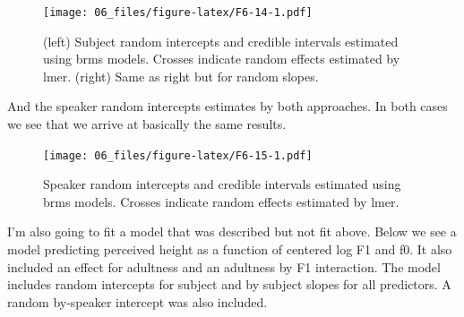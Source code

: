 \documentclass[
]{book}
\begin{document}
\begin{figure}
\centering
\texttt{[image: 06\_files/figure-latex/F6-14-1.pdf]}
\caption{\label{fig:F6-14}(left) Subject random intercepts and credible intervals estimated using brms models. Crosses indicate random effects estimated by lmer. (right) Same as right but for random slopes.}
\end{figure}

And the speaker random intercepts estimates by both approaches. In both cases we see that we arrive at basically the same results.

\begin{figure}
\centering
\texttt{[image: 06\_files/figure-latex/F6-15-1.pdf]}
\caption{\label{fig:F6-15}Speaker random intercepts and credible intervals estimated using brms models. Crosses indicate random effects estimated by lmer.}
\end{figure}

I'm also going to fit a model that was described but not fit above. Below we see a model predicting perceived height as a function of centered log F1 and f0. It also included an effect for adultness and an adultness by F1 interaction. The model includes random intercepts for subject and by subject slopes for all predictors. A random by-speaker intercept was also included.
\end{document}
